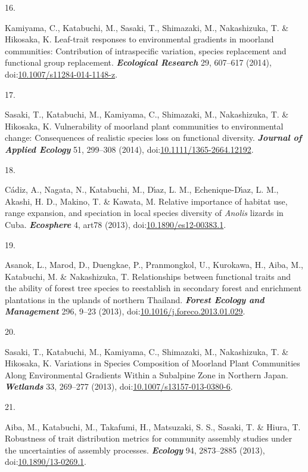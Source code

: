 \documentclass[
]{article}
\newlength{\cslhangindent}
\newlength{\csllabelwidth}
\newlength{\cslentryspacingunit} %
\newenvironment{CSLReferences}[2] %
 {%
  \setlength{\parindent}{0pt}
  \ifodd #1
  \let\oldpar\par
  \def\par{\hangindent=\cslhangindent\oldpar}
  \fi
  \setlength{\parskip}{#2\cslentryspacingunit}
 }%
 {}
\newcommand{\CSLLeftMargin}[1]{\parbox[t]{\csllabelwidth}{#1}}
\newcommand{\CSLRightInline}[1]{\parbox[t]{\linewidth - \csllabelwidth}{#1}\break}
\begin{document}
\begin{CSLReferences}{0}{0}
\leavevmode{}%
\CSLLeftMargin{16. }
\CSLRightInline{Kamiyama, C., Katabuchi, M., Sasaki, T., Shimazaki, M.,
Nakashizuka, T. \& Hikosaka, K. Leaf-trait responses to environmental
gradients in moorland communities: Contribution of intraspecific
variation, species replacement and functional group replacement.
\textbf{\emph{Ecological Research}} 29, 607--617 (2014),
doi:\href{https://doi.org/10.1007/s11284-014-1148-z}{10.1007/s11284-014-1148-z}.}

\leavevmode{}%
\CSLLeftMargin{17. }
\CSLRightInline{Sasaki, T., Katabuchi, M., Kamiyama, C., Shimazaki, M.,
Nakashizuka, T. \& Hikosaka, K. Vulnerability of moorland plant
communities to environmental change: Consequences of realistic species
loss on functional diversity. \textbf{\emph{Journal of Applied Ecology}}
51, 299--308 (2014),
doi:\href{https://doi.org/10.1111/1365-2664.12192}{10.1111/1365-2664.12192}.}

\leavevmode{}%
\CSLLeftMargin{18. }
\CSLRightInline{Cádiz, A., Nagata, N., Katabuchi, M., Dı́az, L. M.,
Echenique-Dı́az, L. M., Akashi, H. D., Makino, T. \& Kawata, M. Relative
importance of habitat use, range expansion, and speciation in local
species diversity of {\emph{Anolis}} lizards in {Cuba}.
\textbf{\emph{Ecosphere}} 4, art78 (2013),
doi:\href{https://doi.org/10.1890/es12-00383.1}{10.1890/es12-00383.1}.}

\leavevmode{}%
\CSLLeftMargin{19. }
\CSLRightInline{Asanok, L., Marod, D., Duengkae, P., Pranmongkol, U.,
Kurokawa, H., Aiba, M., Katabuchi, M. \& Nakashizuka, T. {Relationships
between functional traits and the ability of forest tree species to
reestablish in secondary forest and enrichment plantations in the
uplands of northern Thailand}. \textbf{\emph{Forest Ecology and
Management}} 296, 9--23 (2013),
doi:\href{https://doi.org/10.1016/j.foreco.2013.01.029}{10.1016/j.foreco.2013.01.029}.}

\leavevmode{}%
\CSLLeftMargin{20. }
\CSLRightInline{Sasaki, T., Katabuchi, M., Kamiyama, C., Shimazaki, M.,
Nakashizuka, T. \& Hikosaka, K. {Variations in Species Composition of
Moorland Plant Communities Along Environmental Gradients Within a
Subalpine Zone in Northern Japan}. \textbf{\emph{Wetlands}} 33, 269--277
(2013),
doi:\href{https://doi.org/10.1007/s13157-013-0380-6}{10.1007/s13157-013-0380-6}.}

\leavevmode{}%
\CSLLeftMargin{21. }
\CSLRightInline{Aiba, M., Katabuchi, M., Takafumi, H., Matsuzaki, S. S.,
Sasaki, T. \& Hiura, T. Robustness of trait distribution metrics for
community assembly studies under the uncertainties of assembly
processes. \textbf{\emph{Ecology}} 94, 2873--2885 (2013),
doi:\href{https://doi.org/10.1890/13-0269.1}{10.1890/13-0269.1}.}


\end{CSLReferences}
\end{document}
